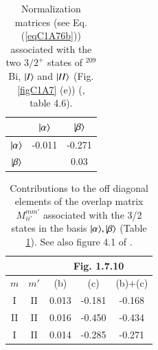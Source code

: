 \begin{subappendices}
\begin{table}
\begin{tabular}{|c|c|c|}
 \hline 
  & $|{\alpha} \rangle$ & $|{\beta} \rangle$ \\
 \hline 
$|{\alpha} \rangle$ &-0.011 & -0.271    \\ 
 \hline
$|{\beta} \rangle$&  & 0.03 \\ 
 \hline
\end{tabular}\caption{Normalization matrices (see Eq. (\ref{eqC1A76b})) associated with the two $3/2^+$ states of $^{209}$Bi, $|{I} \rangle$ and $|{II} \rangle$ (Fig. \ref{figC1A7} (e)) (\cite{Bortignon:77}, table 4.6).}\label{tab1.C.1}
\end{table}
\begin{table}
\begin{tabular}{|c|c|c|c|c|}
\hline
\multicolumn{2}{|c}{ }& \multicolumn{3}{|c|}{Fig. 1.7.10} \\
\hline
$m$&$m'$  & (b) & (c) & (b)+(c)    \\
\hline
I & II  & 0.013 & -0.181 & -0.168    \\
II & II  & 0.016 & -0.450 & -0.434    \\
 I & II  & 0.014 & -0.285 & -0.271    \\
\hline
\end{tabular}\caption{Contributions to the off diagonal elements of the overlap matrix $M_{ii'}^{mm'}$ associated with the 3/2 states in the basis $|{\alpha} \rangle,|{\beta} \rangle$ (Table \ref{tab1.C.1}). See also figure 4.1 of \cite{Bortignon:77}.}\label{tab1.C.2}
\end{table}

\end{subappendices}
